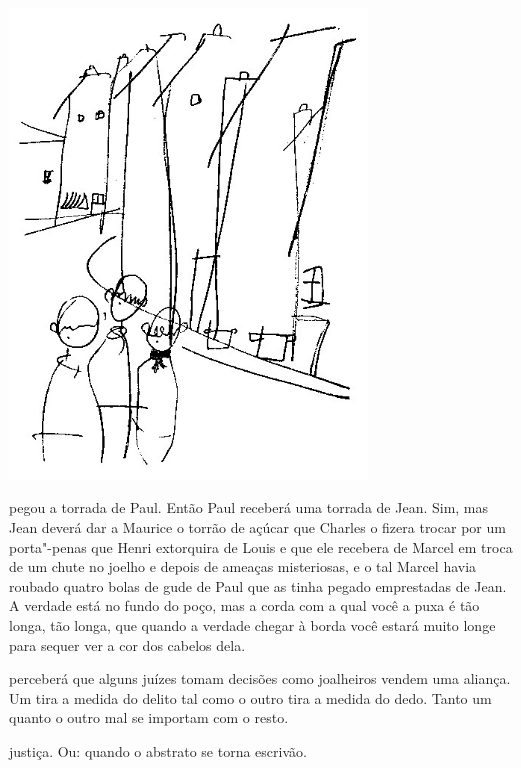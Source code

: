 \begin{vplace}[.50]
\begin{center}
\includegraphics[width=95mm]{./imgs/Image_9.jpg}
\end{center}
\end{vplace}

\pagebreak
\thispagestyle{empty}

\movetooddpage

 pegou a torrada de Paul. Então Paul receberá uma torrada de Jean.
Sim, mas Jean deverá dar a Maurice o torrão de açúcar que Charles o
fizera trocar por um porta"-penas que Henri extorquira de Louis e que ele
recebera de Marcel em troca de um chute no joelho e depois de ameaças
misteriosas, e o tal Marcel havia roubado quatro bolas de gude de Paul
que as tinha pegado emprestadas de Jean. A verdade está no fundo do
poço, mas a corda com a qual você a puxa é tão longa, tão longa, que
quando a verdade chegar à borda você estará muito longe para sequer ver
a cor dos cabelos dela.



 perceberá que alguns juízes tomam decisões como joalheiros vendem
uma aliança. Um tira a medida do delito tal como o outro tira a medida
do dedo. Tanto um quanto o outro mal se importam com o resto.



 justiça. Ou: quando o abstrato se torna escrivão.


